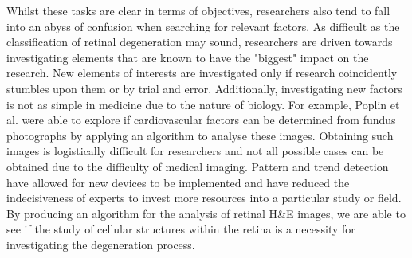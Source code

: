 \documentclass[a4paper]{article}
\begin{document}
        Whilst these tasks are clear in terms of objectives, researchers also tend to fall into an abyss of confusion when searching for relevant factors. As difficult as the classification of retinal degeneration may sound, researchers are driven towards investigating elements that are known to have the "biggest" impact on the research. New elements of interests are investigated only if research coincidently stumbles upon them or by trial and error. Additionally, investigating new factors is not as simple in medicine due to the nature of biology. For example, Poplin et al. \cite{RN15} were able to explore if cardiovascular factors can be determined from fundus photographs by applying an algorithm to analyse these images. Obtaining such images is logistically difficult for researchers and not all possible cases can be obtained due to the difficulty of medical imaging. Pattern and trend detection have allowed for new devices to be implemented and have reduced the indecisiveness of experts to invest more resources into a particular study or field. By producing an algorithm for the analysis of retinal H\&E images, we are able to see if the study of cellular structures within the retina is a necessity for investigating the degeneration process.
        \vspace{3mm}
\end{document}
